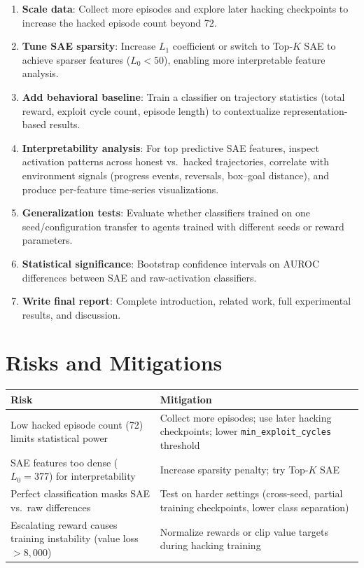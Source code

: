 \documentclass[11pt]{article}
\begin{document}
\begin{enumerate}[nosep]
  \item \textbf{Scale data}: Collect more episodes and explore later hacking checkpoints to increase the hacked episode count beyond 72.
  \item \textbf{Tune SAE sparsity}: Increase $L_1$ coefficient or switch to Top-$K$ SAE to achieve sparser features ($L_0 < 50$), enabling more interpretable feature analysis.
  \item \textbf{Add behavioral baseline}: Train a classifier on trajectory statistics (total reward, exploit cycle count, episode length) to contextualize representation-based results.
  \item \textbf{Interpretability analysis}: For top predictive SAE features, inspect activation patterns across honest vs.\ hacked trajectories, correlate with environment signals (progress events, reversals, box--goal distance), and produce per-feature time-series visualizations.
  \item \textbf{Generalization tests}: Evaluate whether classifiers trained on one seed/configuration transfer to agents trained with different seeds or reward parameters.
  \item \textbf{Statistical significance}: Bootstrap confidence intervals on AUROC differences between SAE and raw-activation classifiers.
  \item \textbf{Write final report}: Complete introduction, related work, full experimental results, and discussion.
\end{enumerate}

\section{Risks and Mitigations}

\begin{center}
\begin{tabular}{p{5.5cm}p{7cm}}
\toprule
Risk & Mitigation \\
\midrule
Low hacked episode count (72) limits statistical power & Collect more episodes; use later hacking checkpoints; lower \texttt{min\_exploit\_cycles} threshold \\
SAE features too dense ($L_0 = 377$) for interpretability & Increase sparsity penalty; try Top-$K$ SAE \\
Perfect classification masks SAE vs.\ raw differences & Test on harder settings (cross-seed, partial training checkpoints, lower class separation) \\
Escalating reward causes training instability (value loss $> 8{,}000$) & Normalize rewards or clip value targets during hacking training \\
\bottomrule
\end{tabular}
\end{center}
\end{document}

